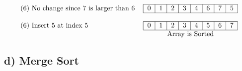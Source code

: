 \documentclass{article}
\begin{document}
\begin{align}
\begin{tabular}{l c}
        \text{(6)  No change since 7 is larger than 6}&\begin{tabular}{|c|c|c|c|c|c|c|c|c|}
            \hline
        0&1&2&3&4&6&7&5\\
            \hline
        \end{tabular}\\&\\
        \text{(6)  Insert 5 at index 5}&\begin{tabular}{|c|c|c|c|c|c|c|c|c|}
            \hline
        0&1&2&3&4&5&6&7\\
            \hline
        \end{tabular}\\
        &\text{Array is Sorted}
    \end{tabular}
\end{align}

\newpage
\subsection*{d) Merge Sort}
\end{document}
